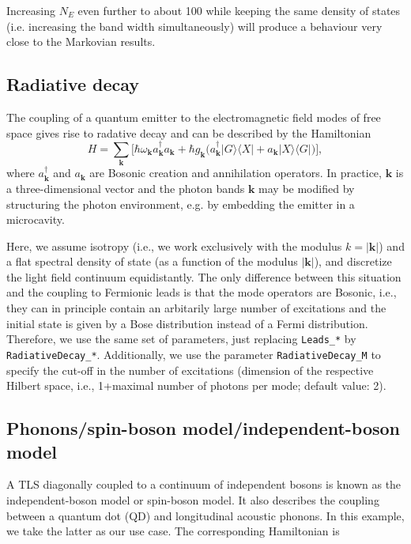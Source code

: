 \documentclass{scrartcl}
\begin{document}
Increasing $N_E$ even further to about 100 while keeping the same density of 
states (i.e. increasing the band width simultaneously) will produce a behaviour
very close to the Markovian results.

\subsection{Radiative decay}
The coupling of a quantum emitter to the electromagnetic field modes of free
space gives rise to radative decay and can be described by the Hamiltonian
\begin{equation}
H=\sum_{\mathbf{k}} \bigg[\hbar\omega_\mathbf{k}a^\dagger_\mathbf{k}a_\mathbf{k}
+ \hbar g_\mathbf{k}\big(a^\dagger_\mathbf{k} |G\rangle\langle X|
+a_\mathbf{k} | X\rangle\langle G| \big) \bigg],
\end{equation}
where $a^\dagger_{\mathbf{k}}$ and $a_{\mathbf{k}}$ are Bosonic creation and
annihilation operators. In practice, $\mathbf{k}$ is a three-dimensional
vector and the photon bands $\mathbf{k}$ may be modified by structuring the
photon environment, e.g. by embedding the emitter in a microcavity. 

%
Here, we assume isotropy (i.e., we work exclusively with the modulus 
$k=|\mathbf{k}|$) and a flat spectral density of state (as a function of 
the modulus $|\mathbf{k}|$), and discretize the light field continuum 
equidistantly. 
The only difference between this situation and the coupling
to Fermionic leads is that the mode operators are Bosonic, i.e., they can
in principle contain an arbitarily large number of excitations and the 
initial state is given by a Bose distribution instead of a Fermi distribution.
Therefore, we use the same set of parameters, just replacing 
\verb+Leads_*+ by \verb+RadiativeDecay_*+. Additionally, we use
the parameter \verb+RadiativeDecay_M+ to specify the cut-off in the number
of excitations (dimension of the respective Hilbert space, i.e., 1+maximal 
number of photons per mode; default value: 2).

\subsection{Phonons/spin-boson model/independent-boson model}
A TLS diagonally coupled to a continuum of independent bosons is known
as the independent-boson model or spin-boson model.
It also describes the coupling between a quantum dot (QD) and longitudinal
acoustic phonons. In this example, we take the latter as our use case.
The corresponding Hamiltonian is
\end{document}
